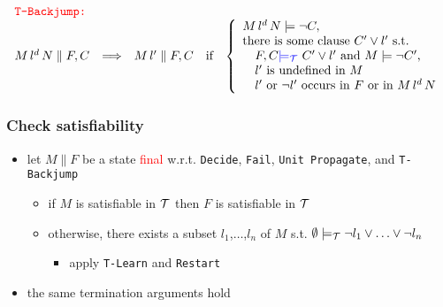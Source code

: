 \documentclass[smaller]{beamer}
\newcommand{\state}[2]{{#1\parallel #2}}
\def\cT{{\cal T}}
\newcommand{\blue}[1]{\textcolor{blue}{#1}}
\newcommand{\red}[1]{\textcolor{red}{#1}}
\begin{document}
\begin{frame}
{\[\begin{array}{lclcl}
\red{\mbox{\tt T-Backjump:}} \\
\state{M\, l^d\, N}{F,C}&\Longrightarrow& \state{M\,l'}{F,C} &\mbox{if} &\left\{\begin{array}{l}
												      M\, l^d\, N\models \neg C,\\
												      \mbox{there is some clause $C'\vee l'$ s.t.} \\
												\ \ \ \mbox{$F,C\blue{\models_\cT}\ C'\vee l'$ and $M\models \neg C'$,}\\    	 											   \ \ \ \mbox{$l'$ is undefined in $M$}\\   				
											\ \ \  \mbox{$l'$ or $\neg l'$ occurs in $F$ or in $M\, l^d\, N$}								      				           \end{array}\right. 
\end{array}
\]}
\end{frame}

\begin{frame}
\frametitle{Check satisfiability}
\begin{itemize}
\setlength\itemsep{2mm}
\item let $\state{M}{F}$ be a state \red{final} w.r.t. {\tt Decide}, {\tt Fail}, {\tt Unit Propagate}, and {\tt T-Backjump}
\vspace{2mm}
	\begin{itemize}
	\setlength\itemsep{2mm}
		\item if $M$ is satisfiable in $\cT$ then $F$ is satisfiable in $\cT$
		\item otherwise, there exists a subset $l_1$,$\ldots$,$l_n$ of $M$ s.t. $\emptyset \models_\cT \neg l_1\vee \ldots\vee \neg l_n$
			\begin{itemize}
				\item apply {\tt T-Learn} and {\tt Restart}
			\end{itemize}
	\end{itemize}
\item the same termination arguments hold
\end{itemize}
\end{frame}
\end{document}
